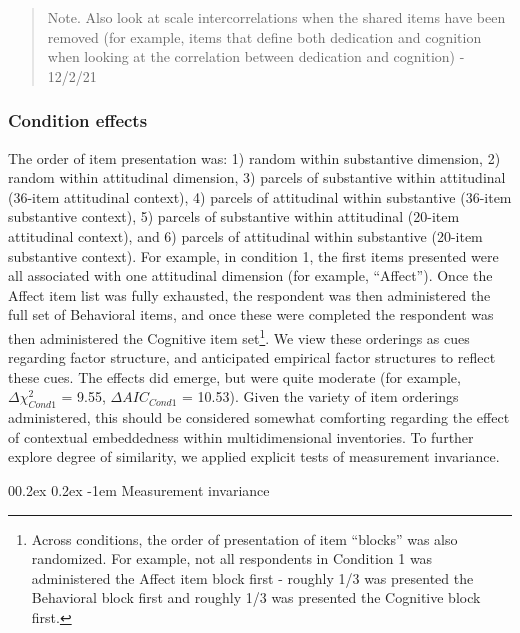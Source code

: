 \documentclass[
  man]{apa6}
\makeatletter
\let\oldparagraph\paragraph
\renewcommand{\paragraph}[1]{\oldparagraph{#1}\mbox{}}
\renewcommand{\paragraph}{\@startsection{paragraph}{4}{\parindent}%
  {0\baselineskip \@plus 0.2ex \@minus 0.2ex}%
  {-1em}%
  {\normalfont\normalsize\bfseries\itshape\typesectitle}}
\makeatother
\begin{document}
\begin{quote}
Note. Also look at scale intercorrelations when the shared items have been removed (for example, items that define both dedication and cognition when looking at the correlation between dedication and cognition) - 12/2/21
\end{quote}

\hypertarget{condition-effects}{%
\subsubsection{Condition effects}\label{condition-effects}}

The order of item presentation was: 1) random within substantive dimension, 2) random within attitudinal dimension, 3) parcels of substantive within attitudinal (36-item attitudinal context), 4) parcels of attitudinal within substantive (36-item substantive context), 5) parcels of substantive within attitudinal (20-item attitudinal context), and 6) parcels of attitudinal within substantive (20-item substantive context). For example, in condition 1, the first items presented were all associated with one attitudinal dimension (for example, ``Affect''). Once the Affect item list was fully exhausted, the respondent was then administered the full set of Behavioral items, and once these were completed the respondent was then administered the Cognitive item set\footnote{Across conditions, the order of presentation of item ``blocks'' was also randomized. For example, not all respondents in Condition 1 was administered the Affect item block first - roughly 1/3 was presented the Behavioral block first and roughly 1/3 was presented the Cognitive block first.}. We view these orderings as cues regarding factor structure, and anticipated empirical factor structures to reflect these cues. The effects did emerge, but were quite moderate (for example, \(\Delta{\chi^2_{Cond1}}\) = 9.55, \(\Delta{AIC_{Cond1}}\) = 10.53). Given the variety of item orderings administered, this should be considered somewhat comforting regarding the effect of contextual embeddedness within multidimensional inventories. To further explore degree of similarity, we applied explicit tests of measurement invariance.

\hypertarget{measurement-invariance}{%
\paragraph{Measurement invariance}\label{measurement-invariance}}
\end{document}
